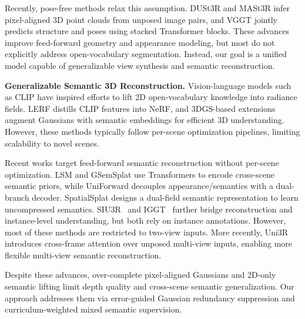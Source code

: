 \documentclass[runningheads]{llncs}
\begin{document}
Recently, pose-free methods relax this assumption. DUSt3R \cite{dust3r} and MASt3R \cite{mast3r} infer pixel-aligned 3D point clouds from unposed image pairs, and VGGT \cite{vggt} jointly predicts structure and poses using stacked Transformer blocks.
These advances improve feed-forward geometry and appearance modeling, but most do not explicitly address open-vocabulary segmentation. 
Instead, our goal is a unified model capable of generalizable view synthesis and semantic reconstruction. 


\noindent
\textbf{Generalizable Semantic 3D Reconstruction.}
Vision-language models such as CLIP \cite{OpenAICLIP,OpenCLIP} have inspired efforts to lift 2D open-vocabulary knowledge into radiance fields.
LERF \cite{LERF} distills CLIP features into NeRF, and 3DGS-based extensions \cite{langsplat, gaugrouping, feature3dgs} augment Gaussians with semantic embeddings for efficient 3D understanding. 
However, these methods typically follow per-scene optimization pipelines, limiting scalability to novel scenes.


Recent works target feed-forward semantic reconstruction without per-scene optimization.
LSM \cite{lsm} and GSemSplat \cite{gsemsplat} use Transformers to encode cross-scene semantic priors, while UniForward \cite{uniforward} decouples appearance/semantics with a dual-branch decoder. 
SpatialSplat \cite{spatialsplat} designs a dual-field semantic representation to learn uncompressed semantics.  
SIU3R~\cite{siu3r} and IGGT~\cite{IGGT} further bridge reconstruction and instance-level understanding, but both rely on instance annotations.
However, most of these methods are restricted to two-view inputs. 
More recently, Uni3R~\cite{uni3r} introduces cross-frame attention over unposed multi-view inputs, enabling more flexible multi-view semantic reconstruction.



Despite these advances, over-complete pixel-aligned Gaussians and 2D-only semantic lifting limit depth quality and cross-scene semantic generalization.
Our approach addresses them via error-guided Gaussian redundancy suppression and curriculum-weighted mixed semantic supervision.
\end{document}
